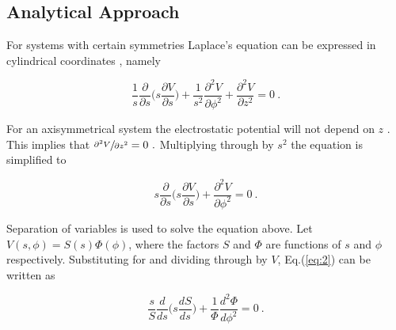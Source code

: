 \documentclass[a4paper]{jpconf}
\begin{document}
\subsection*{Analytical Approach} 

For systems with certain symmetries Laplace's equation can be expressed in cylindrical coordinates \cite{RHB-MathematicalMethods}, namely
 
\begin{equation}
\frac{1}{s}\frac{\partial}{\partial s}\bigg(s \frac{\partial V}{\partial s}\bigg) + \frac{1}{s^2} \frac{\partial^2 V}{\partial \phi^2} + \frac{\partial^2 V}{\partial z^2} = 0~.
\label{eq:1}
\end{equation}


\noindent For an axisymmetrical system the electrostatic potential will not depend on $z$ \cite{griffiths-introElec}. This implies that $\sfrac{\partial^2 V}{\partial z^2} = 0~.$ Multiplying through by $s^2$ the equation is simplified to


\begin{equation}
s \frac{\partial}{\partial s}\bigg(s \frac{\partial V}{\partial s}\bigg) + \frac{\partial^2 V}{\partial \phi^2} = 0~.
\label{eq:2}
\end{equation}

Separation of variables is used to solve the equation above. Let $V(s,\phi) = S(s)\Phi(\phi)$, where the factors $S$ and $\Phi$ are functions of $s$ and $\phi$ respectively. Substituting for and dividing through by $V$, Eq.(\ref{eq:2}) can be written as 

\begin{equation}
\frac{s}{S}\frac{d}{ds}\bigg(s \frac{dS}{ds}\bigg) + \frac{1}{\Phi}\frac{d^2 \Phi}{d \phi^2} = 0~.
\label{eq:3}
\end{equation}
\end{document}
